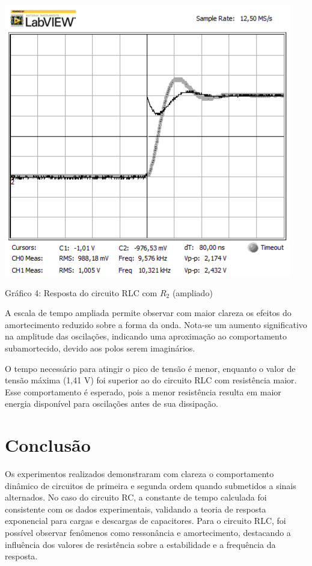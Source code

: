 \documentclass[a4 paper]{article}
\newcommand{\parag}{\hspace{30pt}}
\begin{document}
\newpage
\begin{table}[h]
\centering
\includegraphics[scale=0.6]{rgadicoas/rgadicoa4}
\end{table}

\begin{center}
Gráfico 4: Resposta do circuito RLC com $R_2$ (ampliado)
\end{center}

A escala de tempo ampliada permite observar com maior clareza os efeitos do amortecimento reduzido sobre a forma da onda. Nota-se um aumento significativo na amplitude das oscilações, indicando uma aproximação ao comportamento subamortecido, devido aos polos serem imaginários.

O tempo necessário para atingir o pico de tensão é menor, enquanto o valor de tensão máxima (1,41 V) foi superior ao do circuito RLC com resistência maior. Esse comportamento é esperado, pois a menor resistência resulta em maior energia disponível para oscilações antes de sua dissipação. 






\newpage
\section{Conclusão}

\parag Os experimentos realizados demonstraram com clareza o comportamento dinâmico de circuitos de primeira e segunda ordem quando submetidos a sinais alternados. No caso do circuito RC, a constante de tempo calculada foi consistente com os dados experimentais, validando a teoria de resposta exponencial para cargas e descargas de capacitores. Para o circuito RLC, foi possível observar fenômenos como ressonância e amortecimento, destacando a influência dos valores de resistência sobre a estabilidade e a frequência da resposta.
\end{document}
